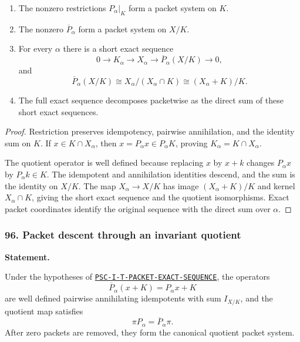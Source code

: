 \begin{enumerate}[label=(\roman*)]
\item The nonzero restrictions $P_\alpha|_K$ form a packet system on $K$.
\item The nonzero $\overline P_\alpha$ form a packet system on $X/K$.
\item For every $\alpha$ there is a short exact sequence
\[
0\longrightarrow K_\alpha
\longrightarrow X_\alpha
\longrightarrow \overline P_\alpha(X/K)
\longrightarrow0,
\]
and
\[
\overline P_\alpha(X/K)
\cong
X_\alpha/(X_\alpha\cap K)
\cong
(X_\alpha+K)/K.
\]
\item The full exact sequence decomposes packetwise as the direct sum of these short exact sequences.
\end{enumerate}

\begin{proof}
Restriction preserves idempotency, pairwise annihilation, and the identity sum on $K$.  If $x\in K\cap X_\alpha$, then $x=P_\alpha x\in P_\alpha K$, proving $K_\alpha=K\cap X_\alpha$.

The quotient operator is well defined because replacing $x$ by $x+k$ changes $P_\alpha x$ by $P_\alpha k\in K$.  The idempotent and annihilation identities descend, and the sum is the identity on $X/K$.  The map $X_\alpha\to X/K$ has image $(X_\alpha+K)/K$ and kernel $X_\alpha\cap K$, giving the short exact sequence and the quotient isomorphisms.  Exact packet coordinates identify the original sequence with the direct sum over $\alpha$.
\end{proof}
\subsubsection*{96. Packet descent through an invariant quotient}
\label{rec:PSC-I-T-QUOTIENT-PACKET-DESCENT}
\textbf{Statement.}\par
Under the hypotheses of \hyperref[rec:PSC-I-T-PACKET-EXACT-SEQUENCE]{\nolinkurl{PSC-I-T-PACKET-EXACT-SEQUENCE}}, the operators
\[
\overline P_\alpha(x+K)=P_\alpha x+K
\]
are well defined pairwise annihilating idempotents with sum $I_{X/K}$, and the quotient map satisfies
\[
\boxed{\pi P_\alpha=\overline P_\alpha\pi.}
\]
After zero packets are removed, they form the canonical quotient packet system.

